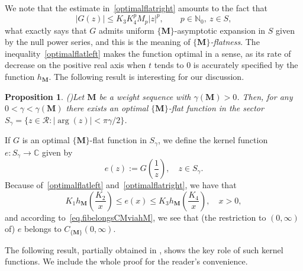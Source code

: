 \documentclass[12pt,a4paper]{article}
\newcommand{\N}{\mathbb{N}}
\newcommand{\C}{\mathbb{C}}
\newcommand{\CM}{C_{\{\M\}}(0,\infty)}
\newcommand{\M}{{\boldsymbol{M}}}
\newcommand{\ga}{\gamma}
\theoremstyle{plain}
\newtheorem{proposition}[theorem]{Proposition}
\theoremstyle{definition}
\numberwithin{equation}{section}
\begin{document}
We note that the estimate in~\eqref{optimalflatright} amounts to the fact that
$$|G(z)|\le K_3K_4^pM_p|z|^p,\qquad p\in\N_0,\ z\in S,
$$
what exactly says that $G$ admits uniform $\{\M\}$-asymptotic expansion in $S$ given by the null power series, and this is the meaning of \emph{$\{\M\}$-flatness}. The inequality~\eqref{optimalflatleft} makes the function optimal in a sense, as its rate of decrease on the positive real axis when $t$ tends to 0 is accurately specified by the function $h_{\M}$.
The following result is interesting for our discussion.

\begin{proposition}(\cite[Prop. 3.10]{JimenezMiguelSanzSchindlOptFlat})\label{prop.ExistOptFlatFunct}
	Let $\M$ be a weight sequence with $\ga(\M)>0$. Then, for any $0<\gamma<\ga(\M)$ there exists an optimal $\{\M\}$-flat function in the sector $S_\ga=\{z\in\mathcal{R}\colon|\arg(z)|<\pi\ga/2\}$.
\end{proposition}

If $G$ is an optimal $\{\M\}$-flat function in $S_\ga$, we define the kernel function $e\colon S_\ga\to\C$ given by
\begin{equation*}
	e(z):=G\left(\frac{1}{z}\right),\quad z\in S_\ga.
\end{equation*}
Because of~\eqref{optimalflatleft} and~\eqref{optimalflatright}, we have that
\begin{equation}\label{eq.Bounds_e_sector}
K_1h_{\M}\left(\frac{K_2}{x}\right)\le e(x)\le K_3h_{\M}\left(\frac{K_4}{x}\right),\quad x>0,
\end{equation}
and according to~\eqref{eq.fibelongsCMviahM}, we see that (the restriction to $(0,\infty)$ of) $e$ belongs to $\CM$.

The following result, partially obtained in \cite[Prop. 3.11]{JimenezMiguelSanzSchindlOptFlat}, shows the key role of such kernel functions. We include the whole proof for the reader's convenience.
\end{document}
